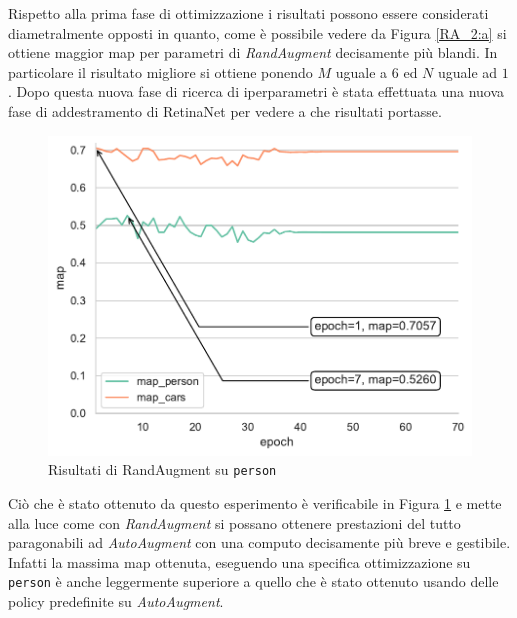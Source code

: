 Rispetto alla prima fase di ottimizzazione i risultati possono essere considerati diametralmente opposti in quanto, come è possibile vedere da Figura \ref{RA_2:a} si ottiene maggior \ac{map} per parametri di \textit{RandAugment} decisamente più blandi. In particolare il risultato migliore si ottiene ponendo $M$ uguale a $6$ ed $N$ uguale ad $1$.
Dopo questa nuova fase di ricerca di iperparametri è stata effettuata una nuova fase di addestramento di RetinaNet per vedere a che risultati portasse.
\begin{figure}[]
    \centering
    \includegraphics[width=\textwidth]{images/graphic/map_person_ra.pdf}
    \caption{Risultati di RandAugment su \texttt{person}}
    \label{fig:ra_person}
\end{figure}

Ciò che è stato ottenuto da questo esperimento è verificabile in Figura \ref{fig:ra_person} e mette alla luce come con \textit{RandAugment} si possano ottenere prestazioni del tutto paragonabili ad \textit{AutoAugment} con una computo decisamente più breve e gestibile. Infatti la massima \ac{map} ottenuta, eseguendo una specifica ottimizzazione su \texttt{person} è anche leggermente superiore a quello che è stato ottenuto usando delle policy predefinite su \textit{AutoAugment}.

